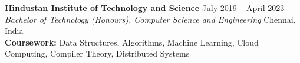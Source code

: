 \documentclass[10pt,letterpaper]{article}
\begin{document}
\vspace{2pt}
\textbf{Hindustan Institute of Technology and Science} \hfill July 2019 -- April 2023\\
\textit{Bachelor of Technology (Honours), Computer Science and Engineering} \hfill Chennai, India\\
{\small\color{muted}\textbf{Coursework:} Data Structures, Algorithms, Machine Learning, Cloud Computing, Compiler Theory, Distributed Systems}
\end{document}
